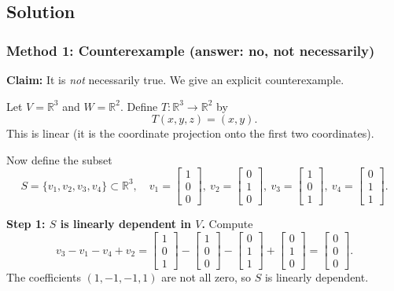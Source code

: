 \documentclass[12pt]{article}
\newcommand{\R}{\mathbb{R}}
\begin{document}
\subsection{Solution}

\subsubsection{Method 1: Counterexample (answer: no, not necessarily)}
\noindent\textbf{Claim:} It is \emph{not} necessarily true. We give an explicit counterexample.

Let $V=\R^3$ and $W=\R^2$. Define $T:\R^3\to\R^2$ by
\[
T(x,y,z)=(x,y).
\]
This is linear (it is the coordinate projection onto the first two coordinates).

Now define the subset
\[
S=\bigl\{v_1,v_2,v_3,v_4\bigr\}\subset \R^3,
\quad
v_1=\begin{bmatrix}1\\0\\0\end{bmatrix},\ 
v_2=\begin{bmatrix}0\\1\\0\end{bmatrix},\ 
v_3=\begin{bmatrix}1\\0\\1\end{bmatrix},\ 
v_4=\begin{bmatrix}0\\1\\1\end{bmatrix}.
\]

\medskip
\noindent\textbf{Step 1: $S$ is linearly dependent in $V$.}
Compute
\[
v_3 - v_1 - v_4 + v_2
=
\begin{bmatrix}1\\0\\1\end{bmatrix}
-
\begin{bmatrix}1\\0\\0\end{bmatrix}
-
\begin{bmatrix}0\\1\\1\end{bmatrix}
+
\begin{bmatrix}0\\1\\0\end{bmatrix}
=
\begin{bmatrix}0\\0\\0\end{bmatrix}.
\]
The coefficients $(1,-1, -1, 1)$ are not all zero, so $S$ is linearly dependent.
\end{document}
